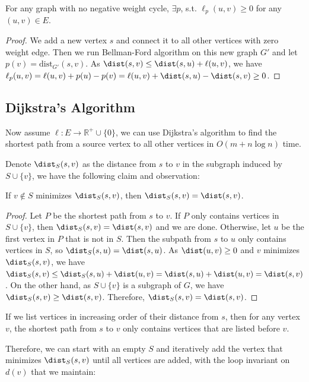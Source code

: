 \begin{lemma}
	For any graph with no negative weight cycle, $\exists p$, s.t. $\ell_p(u,v) \ge 0$ for any $(u,v) \in E$.
\end{lemma}
\begin{proof}
	We add a new vertex $s$ and connect it to all other vertices with zero weight edge. Then we run Bellman-Ford algorithm on this new graph $G'$ and let $p(v) = \text{dist}_{G'}(s,v)$.
	As $\dist(s,v) \le \dist(s,u) + \ell(u,v)$, we have $\ell_p(u,v) = \ell(u,v) + p(u) - p(v) = \ell(u,v) + \dist(s,u) - \dist(s,v) \ge 0$.
\end{proof}


\subsection{Dijkstra's Algorithm}

Now assume $\ell: E \to \mathbb{R}^+ \cup \{0\}$, we can use Dijkstra's algorithm to find the shortest path from a source vertex to all other vertices in $O(m + n \log n)$ time.

Denote $\dist_S(s,v)$ as the distance from $s$ to $v$ in the subgraph induced by $S\cup \{v\}$, we have the following claim and observation:

\begin{lemma}
	If $v\not\in S$ minimizes $\dist_S(s,v)$, then $\dist_S(s,v) = \dist(s,v)$.
\end{lemma}
\begin{proof}
	Let $P$ be the shortest path from $s$ to $v$. If $P$ only contains vertices in $S\cup \{v\}$, then $\dist_S(s,v) = \dist(s,v)$ and we are done. Otherwise, let $u$ be the first vertex in $P$ that is not in $S$. Then the subpath from $s$ to $u$ only contains vertices in $S$, so $\dist_S(s,u) = \dist(s,u)$. As $\dist(u,v)\ge 0$ and $v$ minimizes $\dist_S(s,v)$, we have $\dist_S(s,v) \le \dist_S(s,u) + \dist(u,v) = \dist(s,u) + \dist(u,v) = \dist(s,v)$. On the other hand, as $S\cup \{v\}$ is a subgraph of $G$, we have $\dist_S(s,v) \ge \dist(s,v)$. Therefore, $\dist_S(s,v) = \dist(s,v)$.
\end{proof}

\begin{corollary}
	If we list vertices in increasing order of their distance from $s$, then for any vertex $v$, the shortest path from $s$ to $v$ only contains vertices that are listed before $v$.
\end{corollary}

Therefore, we can start with an empty $S$ and iteratively add the vertex that minimizes $\dist_S(s,v)$ until all vertices are added, with the loop invariant on $d(v)$ that we maintain:

